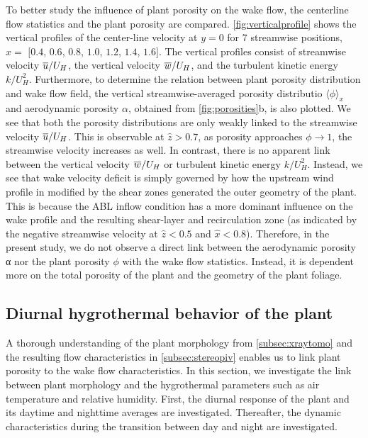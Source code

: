 To better study the influence of plant porosity on the wake flow, the centerline flow statistics and the plant porosity are compared. \cref{fig:verticalprofile} shows the vertical profiles of the center-line velocity at $y=0$ for 7 streamwise positions, $\hat{x} =$ $[0.4$, $0.6$, $0.8$, $1.0$, $1.2$, $1.4$, $1.6]$. The vertical profiles consist of streamwise velocity $\overline{u}/U_H$, the vertical velocity $\overline{w}/U_H$, and the turbulent kinetic energy $k/U_H^2$. Furthermore, to determine the relation between plant porosity distribution and wake flow field, the vertical streamwise-averaged porosity distributio $\langle \phi \rangle_x$ and aerodynamic porosity $\alpha$, obtained from \cref{fig:porosities}b, is also plotted. We see that both the porosity distributions are only weakly linked to the streamwise velocity $\overline{u}/U_H$. This is observable at $\hat{z}>0.7$, as porosity approaches $\phi\rightarrow1$, the streamwise velocity increases as well. In contrast, there is no apparent link between the vertical velocity $\overline{w}/U_H$ or turbulent kinetic energy $k/U_H^2$. Instead, we see that wake velocity deficit is simply governed by how the upstream wind profile in modified by the shear zones generated the outer geometry of the plant. This is because the ABL inflow condition has a more dominant influence on the wake profile and the resulting shear-layer and recirculation zone (as indicated by the negative streamwise velocity at $\hat{z} <0.5$ and $\hat{x}<0.8$). Therefore, in the present study, we do not observe a direct link between the aerodynamic porosity α nor the plant porosity $\phi$ with the wake flow statistics. Instead, it is dependent more on the total porosity of the plant and the geometry of the plant foliage.

\subsection{Diurnal hygrothermal behavior of the plant}
\label{subsec:diurnal}

A thorough understanding of the plant morphology from \cref{subsec:xraytomo} and the resulting flow characteristics in \cref{subsec:stereopiv} enables us to link plant porosity to the wake flow characteristics. In this section, we investigate the link between plant morphology and the hygrothermal parameters such as air temperature and relative humidity. First, the diurnal response of the plant and its daytime and nighttime averages are investigated. Thereafter, the dynamic characteristics during the transition between day and night are investigated. 

